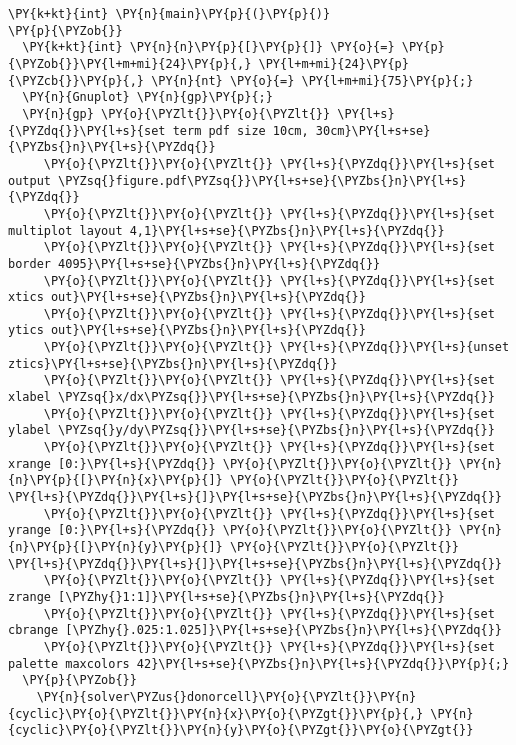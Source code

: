 \begin{Verbatim}[commandchars=\\\{\}]
\PY{k+kt}{int} \PY{n}{main}\PY{p}{(}\PY{p}{)} 
\PY{p}{\PYZob{}}
  \PY{k+kt}{int} \PY{n}{n}\PY{p}{[}\PY{p}{]} \PY{o}{=} \PY{p}{\PYZob{}}\PY{l+m+mi}{24}\PY{p}{,} \PY{l+m+mi}{24}\PY{p}{\PYZcb{}}\PY{p}{,} \PY{n}{nt} \PY{o}{=} \PY{l+m+mi}{75}\PY{p}{;}
  \PY{n}{Gnuplot} \PY{n}{gp}\PY{p}{;}
  \PY{n}{gp} \PY{o}{\PYZlt{}}\PY{o}{\PYZlt{}} \PY{l+s}{\PYZdq{}}\PY{l+s}{set term pdf size 10cm, 30cm}\PY{l+s+se}{\PYZbs{}n}\PY{l+s}{\PYZdq{}} 
     \PY{o}{\PYZlt{}}\PY{o}{\PYZlt{}} \PY{l+s}{\PYZdq{}}\PY{l+s}{set output \PYZsq{}figure.pdf\PYZsq{}}\PY{l+s+se}{\PYZbs{}n}\PY{l+s}{\PYZdq{}}     
     \PY{o}{\PYZlt{}}\PY{o}{\PYZlt{}} \PY{l+s}{\PYZdq{}}\PY{l+s}{set multiplot layout 4,1}\PY{l+s+se}{\PYZbs{}n}\PY{l+s}{\PYZdq{}} 
     \PY{o}{\PYZlt{}}\PY{o}{\PYZlt{}} \PY{l+s}{\PYZdq{}}\PY{l+s}{set border 4095}\PY{l+s+se}{\PYZbs{}n}\PY{l+s}{\PYZdq{}}
     \PY{o}{\PYZlt{}}\PY{o}{\PYZlt{}} \PY{l+s}{\PYZdq{}}\PY{l+s}{set xtics out}\PY{l+s+se}{\PYZbs{}n}\PY{l+s}{\PYZdq{}}
     \PY{o}{\PYZlt{}}\PY{o}{\PYZlt{}} \PY{l+s}{\PYZdq{}}\PY{l+s}{set ytics out}\PY{l+s+se}{\PYZbs{}n}\PY{l+s}{\PYZdq{}}
     \PY{o}{\PYZlt{}}\PY{o}{\PYZlt{}} \PY{l+s}{\PYZdq{}}\PY{l+s}{unset ztics}\PY{l+s+se}{\PYZbs{}n}\PY{l+s}{\PYZdq{}}    
     \PY{o}{\PYZlt{}}\PY{o}{\PYZlt{}} \PY{l+s}{\PYZdq{}}\PY{l+s}{set xlabel \PYZsq{}x/dx\PYZsq{}}\PY{l+s+se}{\PYZbs{}n}\PY{l+s}{\PYZdq{}}
     \PY{o}{\PYZlt{}}\PY{o}{\PYZlt{}} \PY{l+s}{\PYZdq{}}\PY{l+s}{set ylabel \PYZsq{}y/dy\PYZsq{}}\PY{l+s+se}{\PYZbs{}n}\PY{l+s}{\PYZdq{}}
     \PY{o}{\PYZlt{}}\PY{o}{\PYZlt{}} \PY{l+s}{\PYZdq{}}\PY{l+s}{set xrange [0:}\PY{l+s}{\PYZdq{}} \PY{o}{\PYZlt{}}\PY{o}{\PYZlt{}} \PY{n}{n}\PY{p}{[}\PY{n}{x}\PY{p}{]} \PY{o}{\PYZlt{}}\PY{o}{\PYZlt{}} \PY{l+s}{\PYZdq{}}\PY{l+s}{]}\PY{l+s+se}{\PYZbs{}n}\PY{l+s}{\PYZdq{}}   
     \PY{o}{\PYZlt{}}\PY{o}{\PYZlt{}} \PY{l+s}{\PYZdq{}}\PY{l+s}{set yrange [0:}\PY{l+s}{\PYZdq{}} \PY{o}{\PYZlt{}}\PY{o}{\PYZlt{}} \PY{n}{n}\PY{p}{[}\PY{n}{y}\PY{p}{]} \PY{o}{\PYZlt{}}\PY{o}{\PYZlt{}} \PY{l+s}{\PYZdq{}}\PY{l+s}{]}\PY{l+s+se}{\PYZbs{}n}\PY{l+s}{\PYZdq{}}   
     \PY{o}{\PYZlt{}}\PY{o}{\PYZlt{}} \PY{l+s}{\PYZdq{}}\PY{l+s}{set zrange [\PYZhy{}1:1]}\PY{l+s+se}{\PYZbs{}n}\PY{l+s}{\PYZdq{}}   
     \PY{o}{\PYZlt{}}\PY{o}{\PYZlt{}} \PY{l+s}{\PYZdq{}}\PY{l+s}{set cbrange [\PYZhy{}.025:1.025]}\PY{l+s+se}{\PYZbs{}n}\PY{l+s}{\PYZdq{}}     
     \PY{o}{\PYZlt{}}\PY{o}{\PYZlt{}} \PY{l+s}{\PYZdq{}}\PY{l+s}{set palette maxcolors 42}\PY{l+s+se}{\PYZbs{}n}\PY{l+s}{\PYZdq{}}\PY{p}{;}
  \PY{p}{\PYZob{}}
    \PY{n}{solver\PYZus{}donorcell}\PY{o}{\PYZlt{}}\PY{n}{cyclic}\PY{o}{\PYZlt{}}\PY{n}{x}\PY{o}{\PYZgt{}}\PY{p}{,} \PY{n}{cyclic}\PY{o}{\PYZlt{}}\PY{n}{y}\PY{o}{\PYZgt{}}\PY{o}{\PYZgt{}} 

\end{Verbatim}

